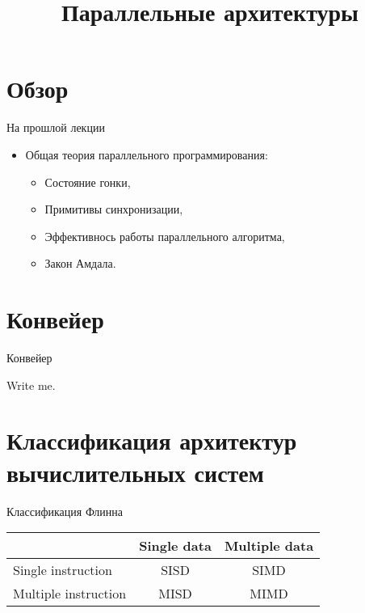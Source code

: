 

\title{Параллельные архитектуры}



\begin{frame}
\titlepage
\end{frame}

\section{Обзор}

\begin{frame}
\tableofcontents
\end{frame} 

\begin{frame}{На прошлой лекции}

\begin{itemize}
    \item Общая теория параллельного программирования:
    \begin{itemize}
        \item Состояние гонки,
        \item Примитивы синхронизации,
        \item Эффективнось работы параллельного алгоритма,
        \item Закон Амдала.
    \end{itemize}
\end{itemize}

\end{frame}

\section{Конвейер}

\begin{frame}{Конвейер}

\todo Write me.

\end{frame}

\section{Классификация архитектур вычислительных систем}

\begin{frame}{Классификация Флинна}

\begin{table}[htp]
    \begin{center}
    \begin{tabular}{|l|c|c|}
        \hline
                                & Single data   & Multiple data \\
        \hline
        Single instruction      & SISD          & SIMD \\
        \hline
        Multiple instruction    & MISD          & MIMD \\
        \hline
    \end{tabular}
    \end{center}
\end{table}

\end{frame}

